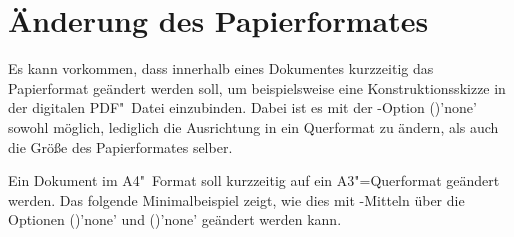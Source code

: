 \section{Änderung des Papierformates}
%
%
Es kann vorkommen, dass innerhalb eines Dokumentes kurzzeitig das Papierformat 
geändert werden soll, um beispielsweise eine Konstruktionsskizze in der 
digitalen PDF"~Datei einzubinden. Dabei ist es mit der \KOMAScript-Option 
()'none' sowohl möglich, lediglich die 
Ausrichtung in ein Querformat zu ändern, als auch die Größe des Papierformates 
selber.
%
\begin{Example}
Ein Dokument im A4"~Format soll kurzzeitig auf ein A3"=Querformat geändert 
werden. Das folgende Minimalbeispiel zeigt, wie dies mit \KOMAScript-Mitteln 
über die Optionen ()'none' und 
()'none' geändert werden kann.
\end{Example}



